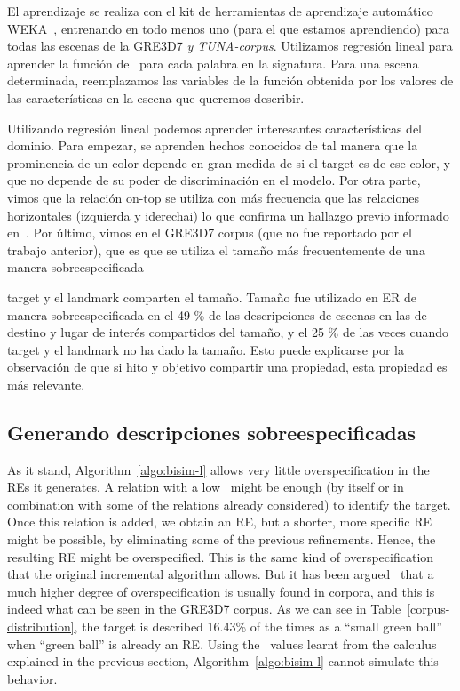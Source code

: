 El aprendizaje se realiza con el kit de herramientas de aprendizaje autom\'atico
WEKA~\cite{Hall:WEK09}, entrenando en todo menos uno (para el que estamos aprendiendo) para todas las escenas de la GRE3D7 \textit{y
  TUNA-corpus}. Utilizamos regresi\'on lineal para aprender la funci\'on de
\puse\ para cada palabra en la signatura. Para una escena determinada, reemplazamos
las variables de la funci\'on obtenida por los valores de las caracter\'{i}sticas
en la escena que queremos describir.

Utilizando regresi\'on lineal podemos aprender interesantes
caracter\'{i}sticas del dominio. Para empezar, se aprenden hechos conocidos
de tal manera que la prominencia de un color depende en gran medida de si el
target es de ese color, y que no depende de su
poder de discriminaci\'on en el modelo. Por otra parte, vimos que la relaci\'on on-top
 se utiliza con m\'as frecuencia que las relaciones horizontales
(izquierda y iderechai) lo que confirma un hallazgo previo informado
en~\cite{viet:gene11}. Por \'ultimo, vimos en el
GRE3D7 corpus (que no fue reportado por el trabajo anterior), que es que se utiliza el tama\~no
m\'as frecuentemente de una manera sobreespecificada

target y el landmark comparten el tama\~no. Tama\~no fue utilizado en ER de manera sobreespecificada en el 49 \% de
las descripciones de escenas en las de destino y lugar de inter\'es compartidos del tama\~no,
y el 25 \% de las veces cuando target y el landmark no ha dado la
tama\~no. Esto puede explicarse por la observaci\'on de que si hito y
objetivo compartir una propiedad, esta propiedad es m\'as relevante.

\subsection{Generando descripciones sobreespecificadas}\label{sec:overspecification}

As it stand, Algorithm~\ref{algo:bisim-l} allows very little overspecification in the REs it
generates.  A relation with a low \puse\ might be enough 
(by itself or in combination with some of the relations already considered) to 
identify the target. Once this relation is added, we obtain an RE, but a shorter, 
more specific RE might be possible, by eliminating some of the previous refinements. 
Hence, the resulting RE might be overspecified. This is the same kind of overspecification 
that the original incremental algorithm allows.  But it has been argued~\cite{Engelhardt_Bailey_Ferreira_2006,Arts_Maes_Noordman_Jansen_2011} that 
a much higher degree of overspecification is usually found in corpora, and this 
is indeed what can be seen in the GRE3D7 corpus.  As we can see in Table~\ref{corpus-distribution}, 
the target is described 16.43\% of the times as a ``small green ball'' when ``green 
ball'' is already an RE.  Using the \puse\ values learnt from the calculus explained
in the previous section, Algorithm~\ref{algo:bisim-l} cannot simulate this behavior. 

